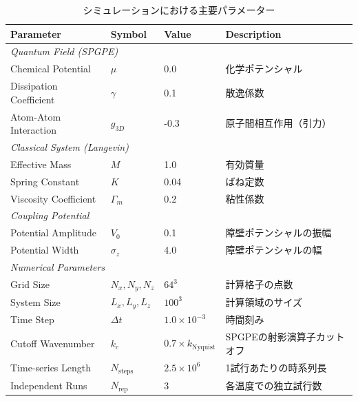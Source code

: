 \documentclass[a4paper,11pt,ja=standard,lualatex]{bxjsarticle}
\begin{document}
\begin{table}[H]
    \centering
    \caption{シミュレーションにおける主要パラメーター}
    \label{tab:parameters}
    \begin{tabular}{llll}
        \hline \hline
        \textbf{Parameter} & \textbf{Symbol} & \textbf{Value} & \textbf{Description} \\ \hline
        \multicolumn{4}{l}{\textit{Quantum Field (SPGPE)}} \\
        \quad Chemical Potential & $\mu$ & 0.0 & 化学ポテンシャル \\
        \quad Dissipation Coefficient & $\gamma$ & 0.1 & 散逸係数 \\
        \quad Atom-Atom Interaction & $g_{3D}$ & -0.3 & 原子間相互作用（引力） \\
        \hline
        \multicolumn{4}{l}{\textit{Classical System (Langevin)}} \\
        \quad Effective Mass & $M$ & 1.0 & 有効質量 \\
        \quad Spring Constant & $K$ & 0.04 & ばね定数 \\
        \quad Viscosity Coefficient & $\Gamma_m$ & 0.2 & 粘性係数 \\
        \hline
        \multicolumn{4}{l}{\textit{Coupling Potential}} \\
        \quad Potential Amplitude & $V_0$ & 0.1 & 障壁ポテンシャルの振幅 \\
        \quad Potential Width & $\sigma_z$ & 4.0 & 障壁ポテンシャルの幅 \\
        \hline
        \multicolumn{4}{l}{\textit{Numerical Parameters}} \\
        \quad Grid Size & $N_x, N_y, N_z$ & $64^3$ & 計算格子の点数 \\
        \quad System Size & $L_x, L_y, L_z$ & $100^3$ & 計算領域のサイズ \\
        \quad Time Step & $\Delta t$ & $1.0 \times 10^{-3}$ & 時間刻み \\
        \quad Cutoff Wavenumber & $k_c$ & $0.7 \times k_{\mathrm{Nyquist}}$ & SPGPEの射影演算子カットオフ \\
        \quad Time-series Length & $N_{\mathrm{steps}}$ & $2.5 \times 10^6$ & 1試行あたりの時系列長 \\
        \quad Independent Runs & $N_{\mathrm{rep}}$ & 3 & 各温度での独立試行数 \\
        \hline \hline
    \end{tabular}
\end{table}
\end{document}
